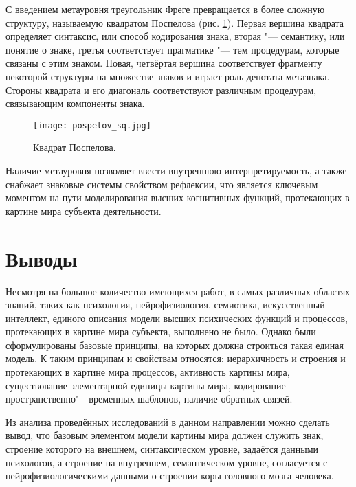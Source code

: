 С введением метауровня треугольник Фреге превращается в более сложную структуру, называемую квадратом Поспелова \cite{Osipov2000b} (рис. \ref{fg:pospelov_sq}). Первая вершина квадрата определяет синтаксис, или способ кодирования знака, вторая  "--- семантику, или понятие о знаке, третья соответствует прагматике "--- тем процедурам, которые связаны с этим знаком. Новая, четвёртая вершина соответствует фрагменту некоторой структуры на множестве знаков и играет роль денотата метазнака. Стороны квадрата и его диагональ соответствуют различным процедурам, связывающим компоненты знака. 

\begin{figure}[h]
	\centering
	\texttt{[image: pospelov\_sq.jpg]}
	\caption{Квадрат Поспелова.}
	\label{fg:pospelov_sq}
\end{figure}
	
Наличие метауровня позволяет ввести внутреннюю интерпретируемость, а также снабжает знаковые системы свойством рефлексии, что является ключевым моментом на пути моделирования высших когнитивных функций, протекающих в картине мира субъекта деятельности.


\section{Выводы} \label{sect1_4}

Несмотря на большое количество имеющихся работ, в самых различных областях знаний, таких как психология, нейрофизиология, семиотика, искусственный интеллект, единого описания модели высших психических функций и процессов, протекающих в картине мира субъекта, выполнено не было. Однако были сформулированы базовые принципы, на которых должна строиться такая единая модель. К таким принципам и свойствам относятся: иерархичность и строения и протекающих в картине мира процессов, активность картины мира, существование элементарной единицы картины мира, кодирование пространственно"--~временных шаблонов, наличие обратных связей. 

Из анализа проведённых исследований в данном направлении можно сделать вывод, что базовым элементом модели картины мира должен служить знак, строение которого на внешнем, синтаксическом уровне, задаётся данными психологов, а строение на внутреннем, семантическом уровне, согласуется с нейрофизиологическими данными о строении коры головного мозга человека.

\clearpage